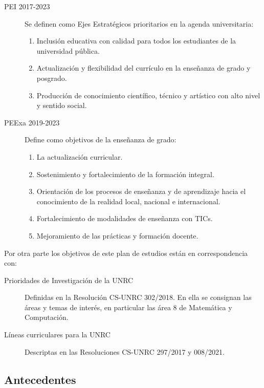 \documentclass[a4paper, 12pt]{article}
\begin{document}
\begin{description}
\begin{enumerate}
\end{enumerate}

\item[PEI 2017-2023] Se definen como Ejes Estratégicos prioritarios en la agenda universitaria:
\begin{enumerate}
 \item Inclusión    educativa    con    calidad    para         todos  los  estudiantes  de  la  universidad  pública.
 
 \item  Actualización  y  flexibilidad  del  currículo  en la enseñanza de grado y posgrado.
 
 \item Producción  de  conocimiento  científico,  técnico y artístico con alto nivel y sentido social. 
\end{enumerate}

\item[PEExa 2019-2023] Define como objetivos de la enseñanza de grado:
\begin{enumerate}
 \item  La actualización curricular.
 \item Sostenimiento y fortalecimiento de la formación integral.
\item Orientación de los procesos de enseñanza y de aprendizaje hacia el
conocimiento de la realidad local, nacional e internacional.
\item Fortalecimiento de modalidades de enseñanza con TICs.
\item Mejoramiento de las prácticas y formación docente.

\end{enumerate}

\end{description}

Por otra parte los objetivos de este plan de estudios están en correspondencia con:

\begin{description}
\item[Prioridades de Investigación de la UNRC] Definidas en la Resolución CS-UNRC 302/2018. 
En ella se consignan las áreas y temas de interés, en particular las área 8 de Matemática y Computación.
\item[Líneas curriculares para la UNRC] Descriptas en las Resoluciones CS-UNRC 297/2017 y 008/2021.
\end{description}




\subsection{Antecedentes}
\end{document}
